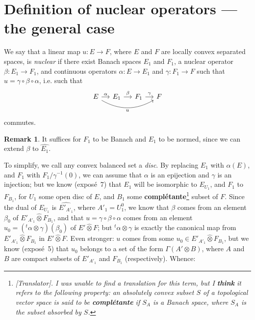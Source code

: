 \documentclass{article}
\theoremstyle{plain}
\theoremstyle{definition}
\newtheorem*{remark}{Remark}
\newenvironment{definition}[1]
    {\renewcommand\theinnercustomdefinition{#1}\innercustomdefinition}
    {\endinnercustomdefinition}
\newcommand{\cotimes}{\widehat{\otimes}}
\newcommand{\transpose}[1]{{}^t\!{#1}}
\begin{document}
\section{Definition of nuclear operators --- the general case}
\label{section4}

\begin{definition}{2}
\label{definition2}
  We say that a linear map $u\colon E\to F$, where $E$ and $F$ are locally convex separated spaces, is \emph{nuclear} if there exist Banach spaces $E_1$ and $F_1$, a nuclear operator $\beta\colon E_1\to F_1$, and continuous operators $\alpha\colon E\to E_1$ and $\gamma\colon F_1\to F$ such that $u=\gamma\circ\beta\circ\alpha$, i.e. such that
  \[
    \begin{tikzcd}[column sep=small]
      E \ar[r,"\alpha"] \ar[rrr,bend right,swap,"u"]
      & E_1 \ar[r,"\beta"]
      & F_1 \ar[r,"\gamma"]
      & F
    \end{tikzcd}
  \]
  commutes.
\end{definition}

\begin{remark}
  It suffices for $F_1$ to be Banach and $E_1$ to be normed, since we can extend $\beta$ to $\widehat{E_1}$.
\end{remark}

To simplify, we call any convex balanced set a \emph{disc}.
By replacing $E_1$ with $\alpha(E)$, and $F_1$ with $F_1/\gamma^{-1}(0)$, we can assume that $\alpha$ is an epijection and $\gamma$ is an injection;
but we know (expos\'{e}~7) that $E_1$ will be isomorphic to $E_{U_1}$, and $F_1$ to $F_{B_1}$, for $U_1$ some open disc of $E$, and $B_1$ some \textbf{compl\'{e}tante}\footnote{\emph{[Translator]. I was unable to find a translation for this term, but I \textbf{think} it refers to the following property: an absolutely convex subset $S$ of a topological vector space is said to be \textbf{compl\'{e}tante} if $S_A$ is a Banach space, where $S_A$ is the subset absorbed by $S$.}} subset of $F$.
Since the dual of $E_{U_1}$ is $\widehat{E'_{A'_1}}$, where $A'_1=U_1^0$, we know that $\beta$ comes from an element $\beta_0$ of $E'_{A'_1}\cotimes F_{B_1}$, and that $u=\gamma\circ\beta\circ\alpha$ comes from an element $u_0=(\transpose{\alpha}\otimes\gamma)(\beta_0)$ of $E'\cotimes F$;
but $\transpose{\alpha}\otimes\gamma$ is exactly the canonical map from $E'_{A'_1}\cotimes F_{B_1}$ in $E'\cotimes F$.
Even stronger: $u$ comes from some $u_0\in E'_{A'_1}\cotimes F_{B_1}$, but we know (expos\'{e}~5) that $u_0$ belongs to a set of the form $\Gamma(A'\otimes B)$, where $A$ and $B$ are compact subsets of $E'_{A'_1}$ and $F_{B_1}$ (respectively).
Whence:
\end{document}
